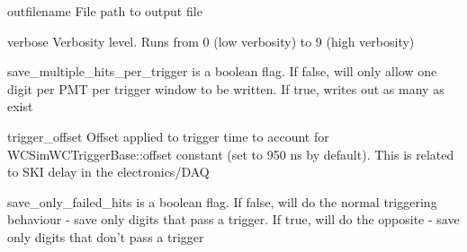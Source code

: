 \begin{DoxyItemize}
\item {\ttfamily outfilename} File path to output file
\item {\ttfamily verbose} Verbosity level. Runs from 0 (low verbosity) to 9 (high verbosity)
\item {\ttfamily save\-\_\-multiple\-\_\-hits\-\_\-per\-\_\-trigger} is a boolean flag. If false, will only allow one digit per P\-M\-T per trigger window to be written. If true, writes out as many as exist
\item {\ttfamily trigger\-\_\-offset} Offset applied to trigger time to account for {\ttfamily W\-C\-Sim\-W\-C\-Trigger\-Base\-::offset} constant (set to 950 ns by default). This is related to S\-K\-I delay in the electronics/\-D\-A\-Q
\item {\ttfamily save\-\_\-only\-\_\-failed\-\_\-hits} is a boolean flag. If false, will do the normal triggering behaviour -\/ save only digits that pass a trigger. If true, will do the opposite -\/ save only digits that don't pass a trigger 
\end{DoxyItemize}